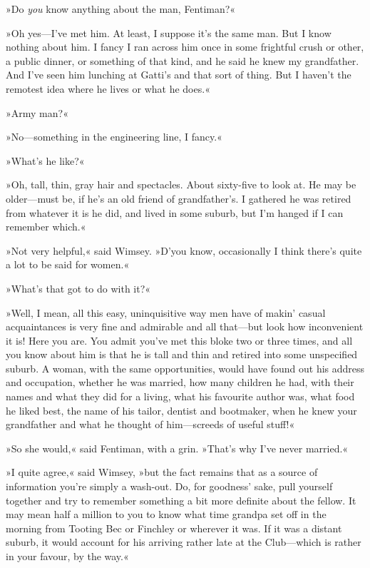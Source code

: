 »Do \textit{you} know anything about the man, Fentiman?«

»Oh yes—I've met him. At least, I suppose it's the same man. But I know nothing about him. I fancy I ran across him once in some frightful crush or other, a public dinner, or something of that kind, and he said he knew my grandfather. And I've seen him lunching at Gatti's and that sort of thing. But I haven't the remotest idea where he lives or what he does.«

»Army man?«

»No—something in the engineering line, I fancy.«

»What's he like?«

»Oh, tall, thin, gray hair and spectacles. About sixty-five to look at. He may be older—must be, if he's an old friend of grandfather's. I gathered he was retired from whatever it is he did, and lived in some suburb, but I'm hanged if I can remember which.«

»Not very helpful,« said Wimsey. »D'you know, occasionally I think there's quite a lot to be said for women.«

»What's that got to do with it?«

»Well, I mean, all this easy, uninquisitive way men have of makin' casual acquaintances is very fine and admirable and all that—but look how inconvenient it is! Here you are. You admit you've met this bloke two or three times, and all you know about him is that he is tall and thin and retired into some unspecified suburb. A woman, with the same opportunities, would have found out his address and occupation, whether he was married, how many children he had, with their names and what they did for a living, what his favourite author was, what food he liked best, the name of his tailor, dentist and bootmaker, when he knew your grandfather and what he thought of him—screeds of useful stuff!«

»So she would,« said Fentiman, with a grin. »That's why I've never married.«

»I quite agree,« said Wimsey, »but the fact remains that as a source of information you're simply a wash-out. Do, for goodness' sake, pull yourself together and try to remember something a bit more definite about the fellow. It may mean half a million to you to know what time grandpa set off in the morning from Tooting Bec or Finchley or wherever it was. If it was a distant suburb, it would account for his arriving rather late at the Club—which is rather in your favour, by the way.«

